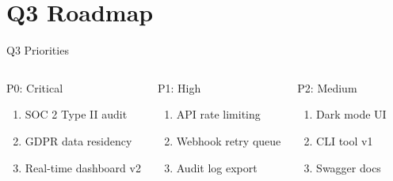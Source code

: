 \documentclass[
  doctype=beamer,
  beameraspectratio=169,
  beamertheme=Berlin,
  institution=generic,
]{omnilatex}
\begin{document}
\section{Q3 Roadmap}

\begin{frame}{Q3 Priorities}
  \begin{columns}[T]
    \begin{block}{P0: Critical}
      \begin{enumerate}
        \item SOC 2 Type II audit
        \item GDPR data residency
        \item Real-time dashboard v2
      \end{enumerate}
    \end{block}

    \begin{block}{P1: High}
      \begin{enumerate}
        \item API rate limiting
        \item Webhook retry queue
        \item Audit log export
      \end{enumerate}
    \end{block}

    \begin{block}{P2: Medium}
      \begin{enumerate}
        \item Dark mode UI
        \item CLI tool v1
        \item Swagger docs
      \end{enumerate}
    \end{block}
  \end{columns}
\end{frame}
\end{document}
